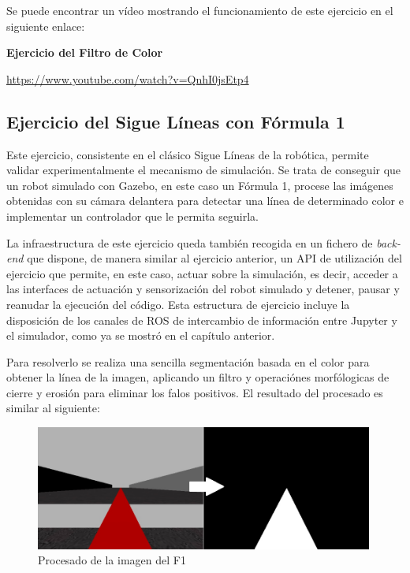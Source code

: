 Se puede encontrar un vídeo mostrando el funcionamiento de este ejercicio en el siguiente enlace:

\textbf{Ejercicio del Filtro de Color}

\url{https://www.youtube.com/watch?v=QnhI0jsEtp4}

\subsection{Ejercicio del Sigue Líneas con Fórmula 1}

Este ejercicio, consistente en el clásico Sigue Líneas de la robótica, permite validar experimentalmente el mecanismo de simulación. Se trata de conseguir que un robot simulado con Gazebo, en este caso un Fórmula 1, procese las imágenes obtenidas con su cámara delantera para detectar una línea de determinado color e implementar un controlador que le permita seguirla.

La infraestructura de este ejercicio queda también recogida en un fichero de \textit{back-end} que dispone, de manera similar al ejercicio anterior, un API de utilización del ejercicio que permite, en este caso, actuar sobre la simulación, es decir, acceder a las interfaces de actuación y sensorización del robot simulado y detener, pausar y reanudar la ejecución del código. Esta estructura de ejercicio incluye la disposición de los canales de ROS de intercambio de información entre Jupyter y el simulador, como ya se mostró en el capítulo anterior.

Para resolverlo se realiza una sencilla segmentación basada en el color para obtener la línea de la imagen, aplicando un filtro y operaciónes morfólogicas de cierre y erosión para eliminar los falos positivos. El resultado del procesado es similar al siguiente:

\begin{figure}[!hbtp]  \centering\noindent
    \includegraphics[width=0.99\textwidth]{figures/fl_process.png}
    \caption{Procesado de la imagen del F1}
    \label{fl_process}
\end{figure}

